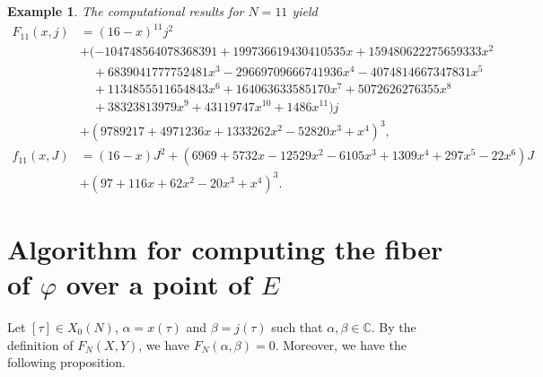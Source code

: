 \documentclass[10pt, a4paper]{article}
\newtheorem{example}[theorem]{Example}
\begin{document}
\begin{example}

The computational results for $N=11$ yield
\begin{align*}
F_{11}(x,j) &= (16 - x)^{11} j^2 \\
&+ (-104748564078368391 + 199736619430410535x + 159480622275659333x^2 \\
&\quad + 6839041777752481x^3 - 29669709666741936x^4 - 4074814667347831x^5 \\
&\quad + 1134855511654843x^6 + 164063633585170x^7 + 5072626276355x^8 \\
&\quad + 38323813979x^9 + 43119747x^{10} + 1486x^{11}) j \\
&+ (9789217 + 4971236x + 1333262x^2 - 52820x^3 + x^4)^3,
\end{align*}
\begin{align*}
f_{11}(x,J) &= (16 - x) J^2 + (6969 + 5732x - 12529x^2 - 6105x^3 + 1309x^4 + 297x^5 - 22x^6) J \\
&+ (97 + 116x + 62x^2 - 20x^3 + x^4)^3.
\end{align*}

\end{example}
\section{Algorithm for computing  the fiber of $\varphi$ over a point of $E$}
Let $[\tau] \in X_0(N)$,  $\alpha = x(\tau)$ and $\beta = j(\tau)$ such that  $\alpha, \beta \in \mathbb{C}$. By the definition of $F_N(X,Y)$, we have $F_N(\alpha, \beta) = 0$. Moreover, we have the following proposition.
\end{document}
